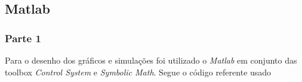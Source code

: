 \documentclass[a4paper,11pt]{article}
\begin{document}
\inputminted[xleftmargin=15pt,linenos,frame=single,framesep=5pt,breaklines=true]{python}{../python/exsim6.py}

\newpage
\subsection*{Matlab}

\subsubsection*{Parte 1}
Para o desenho dos gráficos e simulações foi utilizado o \textit{Matlab} em conjunto das toolbox \textit{Control System}\cite{matlabcontrol} e \textit{Symbolic Math}\cite{matlabsymbolic}. Segue o código referente usado

\inputminted[xleftmargin=15pt,linenos,frame=single,framesep=5pt,breaklines=true]{matlab}{../matlab/exsim6/exsim6.m}


\end{document}
